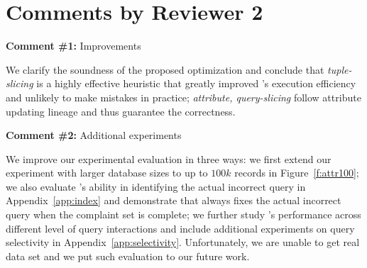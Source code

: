 

\section*{Comments by Reviewer 2}

\noindent
\textbf{Comment \#1:} Improvements
\begin{quote}
\end{quote}

We clarify the soundness of the proposed optimization and conclude that
\emph{tuple-slicing} is a highly effective heuristic that greatly improved
\sys's execution efficiency and unlikely to make mistakes in practice;
\emph{attribute, query-slicing} follow attribute updating lineage and thus
guarantee the correctness.

\comskip

\noindent
\textbf{Comment \#2:} Additional experiments
\begin{quote}
\end{quote}

We improve our experimental evaluation in three ways: we first extend our
experiment with larger database sizes to up to $100k$ records in
Figure~\ref{f:attr100}; we also evaluate \sys's ability in identifying the
actual incorrect query in Appendix~\ref{app:index} and demonstrate that \sys
always fixes the actual incorrect query when the complaint set is complete; we
further study \sys's performance across different level of query interactions
and include additional experiments on query selectivity in
Appendix~\ref{app:selectivity}. Unfortunately, we are unable to get real data
set and we put such evaluation to our future work.
